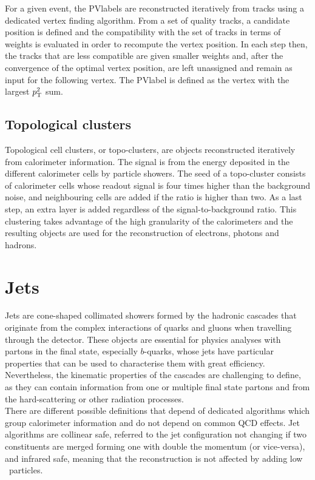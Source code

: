 For a given event, the \acrshort{PVlabel}s are reconstructed iteratively from tracks using a dedicated vertex finding algorithm. From a set of quality tracks, a candidate position is defined and the compatibility with the set of tracks in terms of weights is evaluated in order to recompute the vertex position. In each step then, the tracks that are less compatible are given smaller weights and, after the convergence of the optimal vertex position, are left unassigned and remain as input for the following vertex. The \acrshort{PVlabel} is defined as the vertex with the largest $p_{\text{T}}^2$ sum. 

\subsection{Topological clusters}

Topological cell clusters, or topo-clusters, are objects reconstructed iteratively from calorimeter information. The signal is from the energy deposited in the different calorimeter cells by particle showers. The seed of a topo-cluster consists of calorimeter cells whose readout signal is four times higher than the background noise, and neighbouring cells are added if the ratio is higher than two. As a last step, an extra layer is added regardless of the signal-to-background ratio. This clustering takes advantage of the high granularity of the calorimeters and the resulting objects are used for the reconstruction of electrons, photons and hadrons.

\section{Jets}

Jets are cone-shaped collimated showers formed by the hadronic cascades that originate from the complex interactions of quarks and gluons when travelling through the detector. These objects are essential for physics analyses with partons in the final state, especially $b$-quarks, whose jets have particular properties that can be used to characterise them with great efficiency. Nevertheless, the kinematic properties of the cascades are challenging to define, as they can contain information from one or multiple final state partons and from the hard-scattering or other radiation processes.\\

There are different possible definitions that depend of dedicated algorithms which group calorimeter information and do not depend on common \acrshort{QCD} effects. Jet algorithms are collinear safe, referred to the jet configuration not changing if two constituents are merged forming one with double the momentum (or vice-versa), and infrared safe, meaning that the reconstruction is not affected by adding low \pT\ particles.

